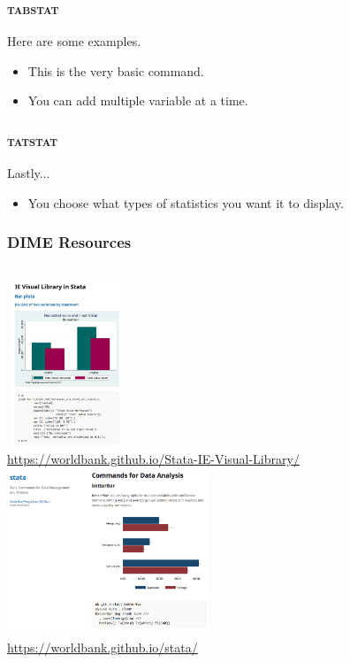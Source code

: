 \documentclass[10pt]{beamer}
\begin{document}
	\begin{frame}
	\frametitle{\textsc{tabstat}}
		Here are some examples.
		\begin{itemize}
			\item This is the very basic command.
\begin{stlog}\end{stlog}
			\vspace{2mm}
			\item You can add multiple variable at a time.
\begin{stlog}\end{stlog}
		\end{itemize}
	\end{frame}
		
	\begin{frame}
	\frametitle{\textsc{tatstat}}
	Lastly...
		\begin{itemize}
			\vspace{2mm}
			\item You choose what types of statistics you want it to display.
\begin{stlog}\end{stlog}
		\end{itemize}
	\end{frame}
	
	\begin{frame}
	\frametitle{DIME Resources}
		\begin{center}
		\begin{columns}
		\column{0.4\linewidth}
		\includegraphics[height=5cm, width=3.5cm]{dime_resource_1} \\
		\tiny \url{https://worldbank.github.io/Stata-IE-Visual-Library/}
		\column{0.6\linewidth}
		\includegraphics[height=5cm, width=6cm]{dime_resource_2} \\
		\tiny \url{https://worldbank.github.io/stata/}
		\end{columns}	
		\end{center}
	\end{frame}
	
\end{document}
